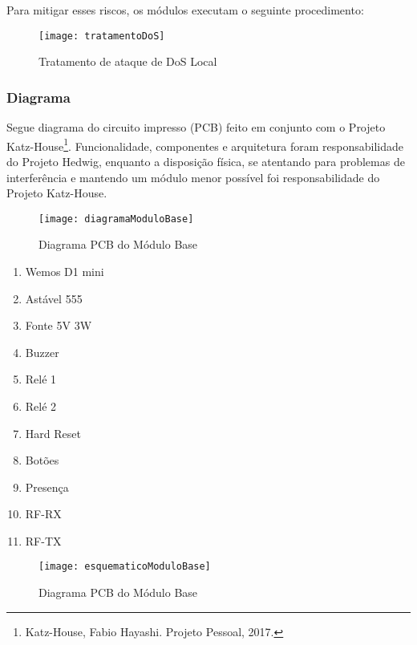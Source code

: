 Para mitigar esses riscos, os módulos executam o seguinte procedimento:
\begin{figure}[H]
	\centering
	\caption{Tratamento de ataque de DoS Local}
  \texttt{[image: tratamentoDoS]}
\label{fig:tratamentoDoS}
\end{figure}

\subsubsection{Diagrama}
Segue diagrama do circuito impresso (PCB) feito em conjunto com o Projeto Katz-House\footnote{Katz-House, Fabio Hayashi. Projeto Pessoal, 2017.}. Funcionalidade, componentes e arquitetura foram responsabilidade do Projeto Hedwig, enquanto a disposição física, se atentando para problemas de interferência e mantendo um módulo menor possível foi responsabilidade do Projeto Katz-House.

\begin{figure}[H]
	\centering
	\caption{Diagrama PCB do Módulo Base}
  \texttt{[image: diagramaModuloBase]}
\label{fig:diagramaModuloBase}
\end{figure}

\begin{enumerate}
\item Wemos D1 mini
\item Astável 555
\item Fonte 5V 3W
\item Buzzer
\item Relé 1
\item Relé 2
\item Hard Reset
\item Botões
\item Presença
\item RF-RX
\item RF-TX
\end{enumerate}

\begin{figure}[H]
	\centering
	\caption{Diagrama PCB do Módulo Base}
  \texttt{[image: esquematicoModuloBase]}
\label{fig:esquematicoModuloBase}
\end{figure}

